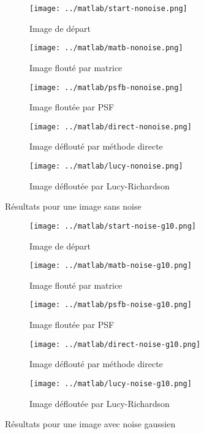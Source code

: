 \documentclass{article}
\begin{document}
\begin{figure}[!ht]
  \centering
  \begin{subfigure}[b]{0.45\textwidth}
    \texttt{[image: ../matlab/start-nonoise.png]}
    \caption{Image de départ}
    \label{fig:start-nonoise}
  \end{subfigure}
  \begin{subfigure}[b]{0.45\textwidth}
    \texttt{[image: ../matlab/matb-nonoise.png]}
    \caption{Image flouté par matrice}
    \label{fig:matb-nonoise}
  \end{subfigure}%
  \begin{subfigure}[b]{0.45\textwidth}
    \texttt{[image: ../matlab/psfb-nonoise.png]}
    \caption{Image floutée par PSF}
    \label{fig:psfb-nonoise_explicite_lambda}
  \end{subfigure}
  \begin{subfigure}[b]{0.45\textwidth}
    \texttt{[image: ../matlab/direct-nonoise.png]}
    \caption{Image déflouté par méthode directe}
    \label{fig:direct-nonoise}
  \end{subfigure}
  \begin{subfigure}[b]{0.45\textwidth}
    \texttt{[image: ../matlab/lucy-nonoise.png]}
    \caption{Image défloutée par Lucy-Richardson}
    \label{fig:lucy-nonoise}
  \end{subfigure}
  \caption{Résultats pour une image sans noise}
  \label{fig:nonoise}
\end{figure}

\begin{figure}[!ht]
  \centering
  \begin{subfigure}[b]{0.45\textwidth}
    \texttt{[image: ../matlab/start-noise-g10.png]}
    \caption{Image de départ}
    \label{fig:start-noise-g10}
  \end{subfigure}
  \begin{subfigure}[b]{0.45\textwidth}
    \texttt{[image: ../matlab/matb-noise-g10.png]}
    \caption{Image flouté par matrice}
    \label{fig:matb-noise-g10}
  \end{subfigure}%
  \begin{subfigure}[b]{0.45\textwidth}
    \texttt{[image: ../matlab/psfb-noise-g10.png]}
    \caption{Image floutée par PSF}
    \label{fig:psfb-noise-g10_explicite_lambda}
  \end{subfigure}
  \begin{subfigure}[b]{0.45\textwidth}
    \texttt{[image: ../matlab/direct-noise-g10.png]}
    \caption{Image déflouté par méthode directe}
    \label{fig:direct-noise-g10}
  \end{subfigure}
  \begin{subfigure}[b]{0.45\textwidth}
    \texttt{[image: ../matlab/lucy-noise-g10.png]}
    \caption{Image défloutée par Lucy-Richardson}
    \label{fig:lucy-noise-g10}
  \end{subfigure}
  \caption{Résultats pour une image avec noise gaussien}
  \label{fig:noise-g10}
\end{figure}
\end{document}
